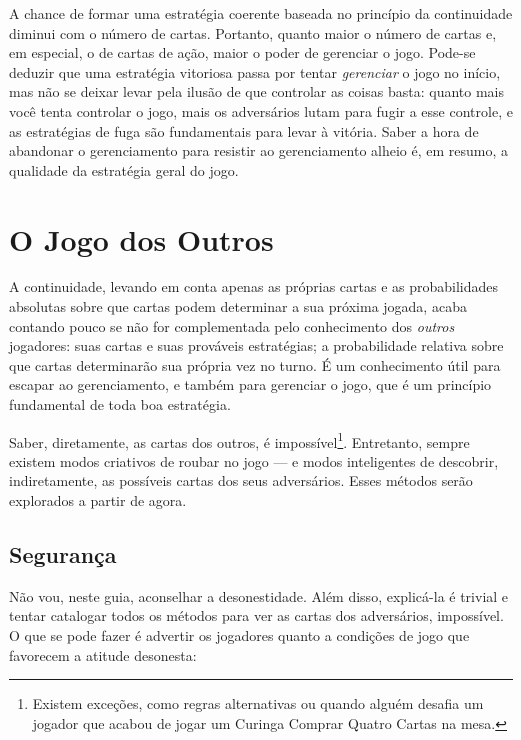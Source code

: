 A chance de formar uma estratégia coerente baseada no princípio da continuidade diminui com o número de cartas. Portanto, quanto maior o número de cartas e, em especial, o de cartas de ação, maior o poder de gerenciar o jogo. Pode-se deduzir que uma estratégia vitoriosa passa por tentar \textit{gerenciar} o jogo no início, mas não se deixar levar pela ilusão de que controlar as coisas basta: quanto mais você tenta controlar o jogo, mais os adversários lutam para fugir a esse controle, e as estratégias de fuga são fundamentais para levar à vitória. Saber a hora de abandonar o gerenciamento para resistir ao gerenciamento alheio é, em resumo, a qualidade da estratégia geral do jogo.

\section{O Jogo dos Outros}

A continuidade, levando em conta apenas as próprias cartas e as probabilidades absolutas sobre que cartas podem determinar a sua próxima jogada, acaba contando pouco se não for complementada pelo conhecimento dos \textit{outros} jogadores: suas cartas e suas prováveis estratégias; a probabilidade relativa sobre que cartas determinarão sua própria vez no turno. É um conhecimento útil para escapar ao gerenciamento, e também para gerenciar o jogo, que é um princípio fundamental de toda boa estratégia.

Saber, diretamente, as cartas dos outros, é impossível\footnote{Existem exceções, como regras alternativas ou quando alguém desafia um jogador que acabou de jogar um Curinga Comprar Quatro Cartas na mesa.}. Entretanto, sempre existem modos criativos de roubar no jogo --- e modos inteligentes de descobrir, indiretamente, as possíveis cartas dos seus adversários. Esses métodos serão explorados a partir de agora.

\subsection{Segurança}

Não vou, neste guia, aconselhar a desonestidade. Além disso, explicá-la é trivial e tentar catalogar todos os métodos para ver as cartas dos adversários, impossível. O que se pode fazer é advertir os jogadores quanto a condições de jogo que favorecem a atitude desonesta:

